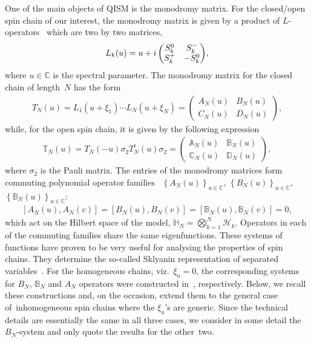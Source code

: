 \documentclass[11pt]{article}
\numberwithin{equation}{section}
\numberwithin{equation}{section}
\begin{document}
One of the main objects of QISM is the monodromy matrix. For the closed/open spin chain of our interest, the monodromy matrix is given by a
product of $L$-operators~\cite{Faddeev:1979gh} which are two by two matrices,
\begin{gather*}
L_k(u)=u+{\rm i}
\begin{pmatrix}
S^0_k& S^-_k\\
S^+_k &-S_k^0
\end{pmatrix}\!,
\end{gather*}
where $u\in \mathbb C$ is the spectral parameter. The monodromy matrix for the closed chain of length~$N$ has the
form~\cite{Faddeev:1979gh}
\begin{gather*}%
T_N(u) =L_1(u+\xi_1)\cdots L_N(u+\xi_N)=\begin{pmatrix}
A_N(u)& B_N(u)\\
C_N(u) & D_N(u)
\end{pmatrix}\!,
\end{gather*}
while, for the open spin chain, it is given by the following expression~\cite{MR953215}
\begin{gather}\label{Topen}
\mathbb{T}_N(u) = T_N(-u) \sigma_2 T_N^{t} (u)\sigma_2 = \begin{pmatrix}
\mathbb{A}_N(u) & \mathbb{B}_N(u)\\
\mathbb{C}_N(u) & \mathbb{D}_N(u)
\end{pmatrix}\!,
\end{gather}
where $\sigma_2$ is the Pauli matrix. The entries of the monodromy matrices form commuting polynomial operator families~\cite{MR953215,Faddeev:1979gh} $\left\{A_N(u)\right\}_{u \in \mathbb{C} }$,
$\left\{B_N(u)\right\}_{u \in \mathbb{C}}$, $\left\{\mathbb{B}_N(u)\right\}_{u \in \mathbb{C}}$:
\begin{gather*}
 \left[A_N(u),A_N(v)\right]=\left[B_N(u),B_N(v)\right]=\left[\mathbb B_N(u),\mathbb B_N(v)\right]=0,
\end{gather*}
which act on the Hilbert space of the model, $\mathbb H_N=\bigotimes_{k=1}^N \mathcal H_k$. Operators in each of the commuting families
share the same eigenfunctions. These systems of functions have proven to be very useful for analysing the properties of spin chains.
They determine the so-called Sklyanin representation of separated variables~\cite{MR1239668}. For the homogeneous chains, viz.~$\xi_a=0$, the corresponding systems for $B_N$, $\mathbb B_N$ and $A_N$ operators were constructed in~\cite{Belitsky:2014rba,Derkachov:2003qb,Derkachov:2002tf}, respectively. Below, we recall these constructions and, on the occasion,
extend them to the general case of~inho\-mo\-ge\-neous spin chains where the $\xi_a$'s are generic. Since the technical details are essentially
the same in all three cases, we consider in some detail the $B_N$-system and only quote the results for the other~two.
\end{document}
